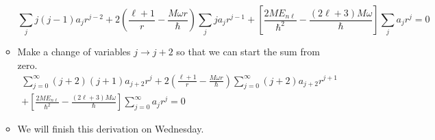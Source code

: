 \documentclass[../notes.tex]{subfiles}
\begin{document}
\begin{itemize}
\begin{itemize}
\begin{equation*}
            \sum_jj(j-1)a_jr^{j-2}+2\left( \frac{\ell+1}{r}-\frac{M\omega r}{\hbar} \right)\sum_jja_jr^{j-1}+\left[ \frac{2ME_{n\ell}}{\hbar^2}-\frac{(2\ell+3)M\omega}{\hbar} \right]\sum_ja_jr^j = 0
        \end{equation*}
        \item Make a change of variables $j\to j+2$ so that we can start the sum from zero.
        \begin{multline*}
            \sum_{j=0}^\infty(j+2)(j+1)a_{j+2}r^j+2\left( \frac{\ell+1}{r}-\frac{M\omega r}{\hbar} \right)\sum_{j=0}^\infty(j+2)a_{j+2}r^{j+1}\\
            +\left[ \frac{2ME_{n\ell}}{\hbar^2}-\frac{(2\ell+3)M\omega}{\hbar} \right]\sum_{j=0}^\infty a_jr^j = 0
        \end{multline*}
        \item We will finish this derivation on Wednesday.
    \end{itemize}
\end{itemize}
\end{document}
